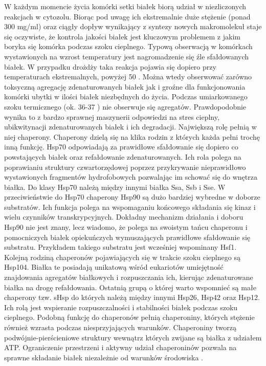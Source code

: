 \documentclass{pracamgr}
\begin{document}
 W każdym  momencie życia komórki setki białek biorą udział w niezliczonych reakcjach w cytozolu. Biorąc pod uwagę ich ekstremalnie
 duże stężenie (ponad 300 mg/ml) oraz ciągły dopływ wynikający z syntezy nowych makromolekuł staje się oczywiste, że 
 kontrola jakości białek jest kluczowym problemem z jakim boryka się komórka podczas szoku cieplnego.
 Typową obserwacją w komórkach wystawionych na wzrost temperatury jest nagromadzenie się źle sfałdowanych białek. 
 W przypadku drożdży taka reakcja pojawia się dopiero przy temperaturach ekstremalnych, powyżej 50 \textcelsius. Można
 wtedy obserwować zarówno toksyczną agregację zdenaturowanych białek jak i groźne dla funkcjonowania komórki ubytki w 
 ilości białek niezbędnych do życia. Podczas umiarkowanego szoku termicznego (ok. 36-37 \textcelsius) nie obserwuje się
 agregatów. Prawdopodobnie wynika to z bardzo sprawnej maszynerii odpowiedzi na stres cieplny, ubikwitynacji zdenaturowanych
 białek i ich degradacji. Największą rolę pełnią w niej chaperony. Chaperony dzielą się na klika 
 rodzin z których każda pełni trochę inną funkcję. Hsp70 odpowiadają za prawidłowe sfałdowanie się dopiero co powstających białek oraz
 refałdowanie zdenaturowanych. Ich rola polega na poprawianiu struktury czwartorzędowej poprzez przykrywanie nieprawidłowo wystawionych fragmentów 
 hydrofobowych pozwalając im schować się do wnętrza białka. Do klasy Hsp70 należą między innymi białka Ssa, Ssb i Sse. W przeciwieństwie do
 Hsp70 chaperony Hsp90 są dużo bardziej wybredne w doborze substratów. Ich funkcja polega na wspomaganiu końcowego składania się kinaz i wielu czynników transkrypcyjnych. 
 Dokładny mechanizm działania i doboru Hsp90 nie jest znany, lecz wiadomo, że polega na swoistym tańcu chaperonu i pomocniczych białek opiekuńczych 
 wymuszających prawidłowe sfałdowanie się substratu. Przykładem takiego substratu jest wcześniej wspominany Hsf1. Kolejną rodziną 
 chaperonów pojawiających się w trakcie szoku cieplnego są Hsp104. Białka te posiadają unikatową wśród eukariotów umiejętność znajdowania
 agregatów białkowych i rozpuszczania ich, kierując zdenaturowane białka na drogę refałdowania. Ostatnią grupą o której warto wspomnieć
 są małe chaperony tzw. sHsp do których należą między innymi Hsp26, Hsp42 oraz Hsp12. Ich rolą jest wspieranie rozpuszczalności i stabilności białek
 podczas szoku cieplnego. Podobną funkcję do chaperonów pełnią chaperoniny, których stężenie również wzrasta podczas niesprzyjających warunków.
 Chaperoniny tworzą podwójnie-pierścieniowe struktury wewnątrz których zwijane są białka z udziałem ATP. Ograniczenie przestrzeni i aktywny udział chaperoninów
 pozwala na sprawne składanie białek niezależnie od warunków środowiska \cite{Bible}.
\end{document}
